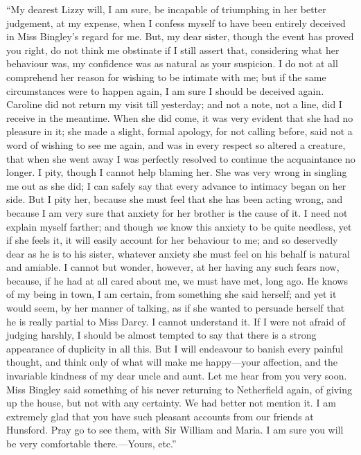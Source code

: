 “My dearest Lizzy will, I am sure, be incapable of triumphing in her better judgement, at my expense, when I confess myself to have been entirely deceived in Miss Bingley's regard for me. But, my dear sister, though the event has proved you right, do not think me obstinate if I still assert that, considering what her behaviour was, my confidence was as natural as your suspicion. I do not at all comprehend her reason for wishing to be intimate with me; but if the same circumstances were to happen again, I am sure I should be deceived again. Caroline did not return my visit till yesterday; and not a note, not a line, did I receive in the meantime. When she did come, it was very evident that she had no pleasure in it; she made a slight, formal apology, for not calling before, said not a word of wishing to see me again, and was in every respect so altered a creature, that when she went away I was perfectly resolved to continue the acquaintance no longer. I pity, though I cannot help blaming her. She was very wrong in singling me out as she did; I can safely say that every advance to intimacy began on her side. But I pity her, because she must feel that she has been acting wrong, and because I am very sure that anxiety for her brother is the cause of it. I need not explain myself farther; and though {\em we} know this anxiety to be quite needless, yet if she feels it, it will easily account for her behaviour to me; and so deservedly dear as he is to his sister, whatever anxiety she must feel on his behalf is natural and amiable. I cannot but wonder, however, at her having any such fears now, because, if he had at all cared about me, we must have met, long ago. He knows of my being in town, I am certain, from something she said herself; and yet it would seem, by her manner of talking, as if she wanted to persuade herself that he is really partial to Miss Darcy. I cannot understand it. If I were not afraid of judging harshly, I should be almost tempted to say that there is a strong appearance of duplicity in all this. But I will endeavour to banish every painful thought, and think only of what will make me happy---your affection, and the invariable kindness of my dear uncle and aunt. Let me hear from you very soon. Miss Bingley said something of his never returning to Netherfield again, of giving up the house, but not with any certainty. We had better not mention it. I am extremely glad that you have such pleasant accounts from our friends at Hunsford. Pray go to see them, with Sir William and Maria. I am sure you will be very comfortable there.---Yours, etc.”

